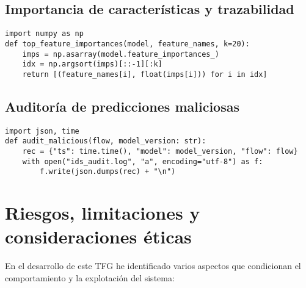 \subsection*{Importancia de características y trazabilidad}
\begin{lstlisting}[style=tfgpython,caption={Exportar top‑20 importancias de características},label=List.TopImportances]
import numpy as np
def top_feature_importances(model, feature_names, k=20):
    imps = np.asarray(model.feature_importances_)
    idx = np.argsort(imps)[::-1][:k]
    return [(feature_names[i], float(imps[i])) for i in idx]
\end{lstlisting}

\subsection*{Auditoría de predicciones maliciosas}
\begin{lstlisting}[style=tfgpython,caption={Registro de auditoría opcional},label=List.AuditLog]
import json, time
def audit_malicious(flow, model_version: str):
    rec = {"ts": time.time(), "model": model_version, "flow": flow}
    with open("ids_audit.log", "a", encoding="utf-8") as f:
        f.write(json.dumps(rec) + "\n")
\end{lstlisting}

\section{Riesgos, limitaciones y consideraciones éticas}
En el desarrollo de este TFG he identificado varios aspectos que condicionan el comportamiento y la explotación del sistema:

